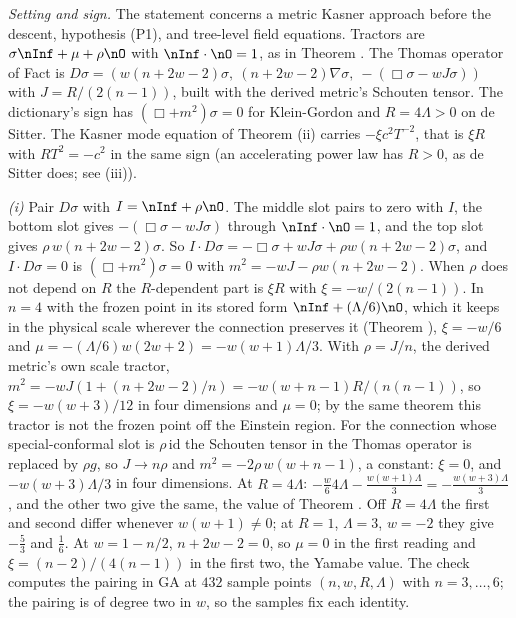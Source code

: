\emph{Setting and sign.} The statement concerns a metric Kasner approach before the descent, hypothesis (P1), and tree-level field equations. Tractors are $\sigma\nInf + \mu + \rho\nO$ with $\nInf \cdot \nO = 1$, as in Theorem . The Thomas operator of Fact  is $D\sigma = (w(n + 2w - 2)\sigma,\ (n + 2w - 2)\nabla\sigma,\ -(\Box\sigma - wJ\sigma))$ with $J = R/(2(n - 1))$, built with the derived metric's Schouten tensor. The dictionary's sign has $(\Box + m^{2})\sigma = 0$ for Klein-Gordon and $R = 4\Lambda > 0$ on de Sitter. The Kasner mode equation of Theorem (ii) carries $-\xi c^{2}T^{-2}$, that is $\xi R$ with $RT^{2} = -c^{2}$ in the same sign (an accelerating power law has $R > 0$, as de Sitter does; see (iii)).

\emph{(i)} Pair $D\sigma$ with $I = \nInf + \rho\nO$. The middle slot pairs to zero with $I$, the bottom slot gives $-(\Box\sigma - wJ\sigma)$ through $\nInf \cdot \nO = 1$, and the top slot gives $\rho\,w(n + 2w - 2)\sigma$. So $I \cdot D\sigma = -\Box\sigma + wJ\sigma + \rho w(n + 2w - 2)\sigma$, and $I \cdot D\sigma = 0$ is $(\Box + m^{2})\sigma = 0$ with $m^{2} = -wJ - \rho w(n + 2w - 2)$. When $\rho$ does not depend on $R$ the $R$-dependent part is $\xi R$ with $\xi = -w/(2(n - 1))$. In $n = 4$ with the frozen point in its stored form $\nInf + (\Lambda/6)\nO$, which it keeps in the physical scale wherever the connection preserves it (Theorem ), $\xi = -w/6$ and $\mu = -(\Lambda/6)w(2w + 2) = -w(w + 1)\Lambda/3$. With $\rho = J/n$, the derived metric's own scale tractor, $m^{2} = -wJ(1 + (n + 2w - 2)/n) = -w(w + n - 1)R/(n(n - 1))$, so $\xi = -w(w + 3)/12$ in four dimensions and $\mu = 0$; by the same theorem this tractor is not the frozen point off the Einstein region. For the connection whose special-conformal slot is $\rho\,\mathrm{id}$ the Schouten tensor in the Thomas operator is replaced by $\rho g$, so $J \to n\rho$ and $m^{2} = -2\rho\,w(w + n - 1)$, a constant: $\xi = 0$, and $-w(w + 3)\Lambda/3$ in four dimensions. At $R = 4\Lambda$: $-\tfrac{w}{6}4\Lambda - \tfrac{w(w + 1)\Lambda}{3} = -\tfrac{w(w + 3)\Lambda}{3}$, and the other two give the same, the value of Theorem . Off $R = 4\Lambda$ the first and second differ whenever $w(w + 1) \neq 0$; at $R = 1$, $\Lambda = 3$, $w = -2$ they give $-\tfrac53$ and $\tfrac16$. At $w = 1 - n/2$, $n + 2w - 2 = 0$, so $\mu = 0$ in the first reading and $\xi = (n - 2)/(4(n - 1))$ in the first two, the Yamabe value. The check computes the pairing in GA at $432$ sample points $(n, w, R, \Lambda)$ with $n = 3, \dots, 6$; the pairing is of degree two in $w$, so the samples fix each identity.

